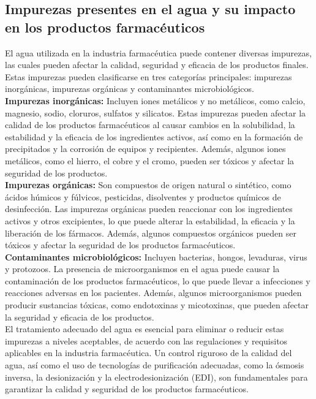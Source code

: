 \subsection{Impurezas presentes en el agua y su impacto en los productos farmacéuticos}

El agua utilizada en la industria farmacéutica puede contener diversas impurezas, las cuales pueden afectar la calidad, seguridad y eficacia de los productos finales. Estas impurezas pueden clasificarse en tres categorías principales: impurezas inorgánicas, impurezas orgánicas y contaminantes microbiológicos.\\

\textbf{Impurezas inorgánicas: }Incluyen iones metálicos y no metálicos, como calcio, magnesio, sodio, cloruros, sulfatos y silicatos. Estas impurezas pueden afectar la calidad de los productos farmacéuticos al causar cambios en la solubilidad, la estabilidad y la eficacia de los ingredientes activos, así como en la formación de precipitados y la corrosión de equipos y recipientes. Además, algunos iones metálicos, como el hierro, el cobre y el cromo, pueden ser tóxicos y afectar la seguridad de los productos.\\
\textbf{Impurezas orgánicas: }Son compuestos de origen natural o sintético, como ácidos húmicos y fúlvicos, pesticidas, disolventes y productos químicos de desinfección. Las impurezas orgánicas pueden reaccionar con los ingredientes activos y otros excipientes, lo que puede alterar la estabilidad, la eficacia y la liberación de los fármacos. Además, algunos compuestos orgánicos pueden ser tóxicos y afectar la seguridad de los productos farmacéuticos.\\
\textbf{Contaminantes microbiológicos:} Incluyen bacterias, hongos, levaduras, virus y protozoos. La presencia de microorganismos en el agua puede causar la contaminación de los productos farmacéuticos, lo que puede llevar a infecciones y reacciones adversas en los pacientes. Además, algunos microorganismos pueden producir sustancias tóxicas, como endotoxinas y micotoxinas, que pueden afectar la seguridad y eficacia de los productos.\\

El tratamiento adecuado del agua es esencial para eliminar o reducir estas impurezas a niveles aceptables, de acuerdo con las regulaciones y requisitos aplicables en la industria farmacéutica. Un control riguroso de la calidad del agua, así como el uso de tecnologías de purificación adecuadas, como la ósmosis inversa, la desionización y la electrodesionización (EDI), son fundamentales para garantizar la calidad y seguridad de los productos farmacéuticos.\\
